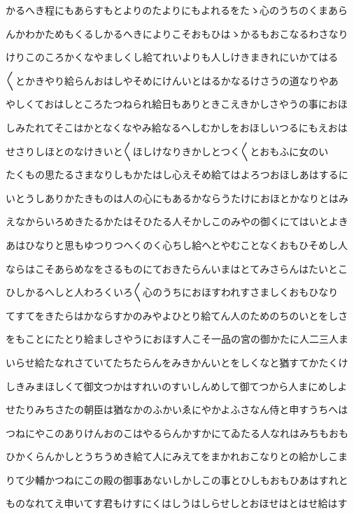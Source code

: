 \documentclass[a4paper,11pt,landscape]{ltjtarticle}
\begin{document}
かるへき程にもあらすもとよりのたよりにもよれるをたゝ心のうちのくまあら
\par\medskip
んかわかためもくるしかるへきによりこそおもひはゝかるもおこなるわさなり
\par\medskip
けりこのころかくなやましくし給てれいよりも人しけきまきれにいかてはる
\par\medskip
〱とかきやり給らんおはしやそめにけんいとはるかなるけさうの道なりやあ
\par\medskip
やしくておはしところたつねられ給日もありときこえきかしさやうの事におほ
\par\medskip
しみたれてそこはかとなくなやみ給なるへしむかしをおほしいつるにもえおは
\par\medskip
せさりしほとのなけきいと〱ほしけなりきかしとつく〱とおもふに女のい
\par\medskip
たくもの思たるさまなりしもかたはし心えそめ給てはよろつおほしあはするに
\par\medskip
いとうしありかたきものは人の心にもあるかならうたけにおほとかなりとはみ
\par\medskip
えなからいろめきたるかたはそひたる人そかしこのみやの御くにてはいとよき
\par\medskip
あはひなりと思もゆつりつへくのく心ちし給へとやむことなくおもひそめし人
\par\medskip
ならはこそあらめなをさるものにておきたらんいまはとてみさらんはたいとこ
\par\medskip
ひしかるへしと人わろくいろ〱心のうちにおほすわれすさましくおもひなり
\par\medskip
てすてをきたらはかならすかのみやよひとり給てん人のためのちのいとをしさ
\par\medskip
をもことにたとり給ましさやうにおほす人こそ一品の宮の御かたに人二三人ま
\par\medskip
いらせ給たなれさていてたちたらんをみきかんいとをしくなと猶すてかたくけ
\par\medskip
しきみまほしくて御文つかはすれいのすいしんめして御てつから人まにめしよ
\par\medskip
せたりみちさたの朝臣は猶なかのふかいゑにやかよふさなん侍と申すうちへは
\par\medskip
つねにやこのありけんおのこはやるらんかすかにてゐたる人なれはみちもおも
\par\medskip
ひかくらんかしとうちうめき給て人にみえてをまかれおこなりとの給かしこま
\par\medskip
りて少輔かつねにこの殿の御事あないしかしこの事とひしもおもひあはすれと
\par\medskip
ものなれてえ申いてす君もけすにくはしうはしらせしとおほせはとはせ給はす
\end{document}
